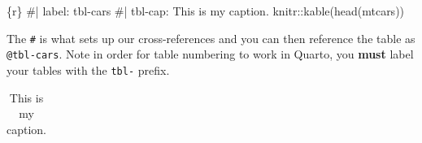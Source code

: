 \documentclass[
  letterpaper,
  11pt,
  english,
  singlespacing,
  headsepline]{MastersDoctoralThesis}
\newenvironment{Shaded}{\begin{snugshade}}{\end{snugshade}}
\newcommand{\InformationTok}[1]{\textcolor[rgb]{0.37,0.37,0.37}{#1}}
\begin{document}
\begin{Shaded}
\begin{Highlighting}[]
\InformationTok{\textasciigrave{}\textasciigrave{}\textasciigrave{}\{r\}}
\InformationTok{\#| label: tbl{-}cars}
\InformationTok{\#| tbl{-}cap: This is my caption.}
\InformationTok{knitr::kable(head(mtcars))}
\InformationTok{\textasciigrave{}\textasciigrave{}\textasciigrave{}}
\end{Highlighting}
\end{Shaded}

The \texttt{\#\textbar{}} is what sets up our cross-references and you
can then reference the table as \texttt{@tbl-cars}. Note in order for
table numbering to work in Quarto, you \textbf{must} label your tables
with the \texttt{tbl-} prefix.

\begin{longtable}[]{@{}
  >{\raggedright\arraybackslash}p{}
  >{\raggedleft\arraybackslash}p{}
  >{\raggedleft\arraybackslash}p{}
  >{\raggedleft\arraybackslash}p{}
  >{\raggedleft\arraybackslash}p{}
  >{\raggedleft\arraybackslash}p{}
  >{\raggedleft\arraybackslash}p{}
  >{\raggedleft\arraybackslash}p{}
  >{\raggedleft\arraybackslash}p{}
  >{\raggedleft\arraybackslash}p{}
  >{\raggedleft\arraybackslash}p{}
  >{\raggedleft\arraybackslash}p{}@{}}

\caption{\label{tbl-cars}This is my caption.}

\tabularnewline


\end{longtable}
\end{document}
